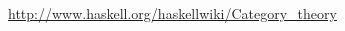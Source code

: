 \documentclass{jsarticle}
\begin{document}










\begin{thebibliography}{99}

\url{http://www.haskell.org/haskellwiki/Category_theory}

\end{thebibliography}
\end{document}
